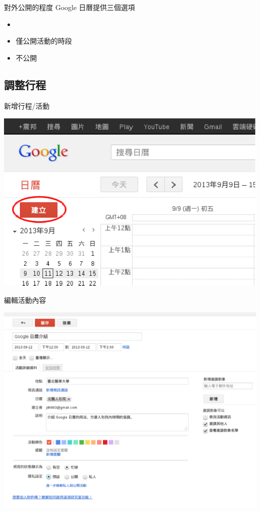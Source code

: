 \documentclass{beamer}
\begin{document}
\begin{frame}{對外公開的程度}
  Google 日曆提供三個選項
  \begin{itemize}
    \item
    \item 僅公開活動的時段
    \item 不公開
  \end{itemize}
\end{frame}

\subsection{調整行程}
\begin{frame}{新增行程/活動}
  \begin{center}
    \includegraphics[scale=0.5]{create.eps}
  \end{center}
\end{frame}

\begin{frame}{編輯活動內容}
  \begin{center}
    \includegraphics[scale=0.35]{edit.eps}
  \end{center}
\end{frame}
\end{document}
